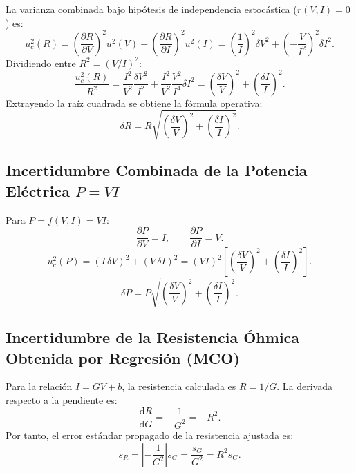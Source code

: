 \begin{appendices}
La varianza combinada bajo hipótesis de independencia estocástica ($r(V, I) = 0$) es:
\begin{equation}
    u_c^2(R) = \left( \frac{\partial R}{\partial V} \right)^2 u^2(V) + \left( \frac{\partial R}{\partial I} \right)^2 u^2(I) = \left( \frac{1}{I} \right)^2 \delta V^2 + \left( -\frac{V}{I^2} \right)^2 \delta I^2.
\end{equation}
Dividiendo entre $R^2 = (V/I)^2$:
\begin{equation}
    \frac{u_c^2(R)}{R^2} = \frac{I^2}{V^2} \frac{\delta V^2}{I^2} + \frac{I^2}{V^2} \frac{V^2}{I^4} \delta I^2 = \left( \frac{\delta V}{V} \right)^2 + \left( \frac{\delta I}{I} \right)^2.
\end{equation}
Extrayendo la raíz cuadrada se obtiene la fórmula operativa:
\begin{equation}
    \boxed{\delta R = R \sqrt{ \left( \frac{\delta V}{V} \right)^2 + \left( \frac{\delta I}{I} \right)^2 }.}
    \label{eq:anexo_delta_r}
\end{equation}

\subsection{Incertidumbre Combinada de la Potencia Eléctrica \texorpdfstring{$P = V I$}{P = V I}}
Para $P = f(V, I) = V I$:
\begin{equation}
    \frac{\partial P}{\partial V} = I, \qquad \frac{\partial P}{\partial I} = V.
\end{equation}
\begin{equation}
    u_c^2(P) = (I\,\delta V)^2 + (V\,\delta I)^2 = (V I)^2 \left[ \left(\frac{\delta V}{V}\right)^2 + \left(\frac{\delta I}{I}\right)^2 \right].
\end{equation}
\begin{equation}
    \boxed{\delta P = P \sqrt{ \left( \frac{\delta V}{V} \right)^2 + \left( \frac{\delta I}{I} \right)^2 }.}
    \label{eq:anexo_delta_p}
\end{equation}

\subsection{Incertidumbre de la Resistencia Óhmica Obtenida por Regresión (MCO)}
Para la relación $I = G V + b$, la resistencia calculada es $R = 1/G$. La derivada respecto a la pendiente es:
\begin{equation}
    \frac{\mathrm{d}R}{\mathrm{d}G} = -\frac{1}{G^2} = -R^2.
\end{equation}
Por tanto, el error estándar propagado de la resistencia ajustada es:
\begin{equation}
    \boxed{s_R = \left| -\frac{1}{G^2} \right| s_G = \frac{s_G}{G^2} = R^2 s_G.}
    \label{eq:anexo_error_resistencia_ols}
\end{equation}


\end{appendices}
